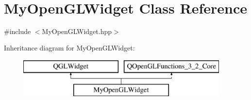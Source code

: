 \hypertarget{class_my_open_g_l_widget}{\section{My\+Open\+G\+L\+Widget Class Reference}
\label{class_my_open_g_l_widget}
}


{\ttfamily \#include $<$My\+Open\+G\+L\+Widget.\+hpp$>$}

Inheritance diagram for My\+Open\+G\+L\+Widget\+:\begin{figure}[H]
\begin{center}
\leavevmode
\includegraphics[height=2.000000cm]{class_my_open_g_l_widget}
\end{center}
\end{figure}
